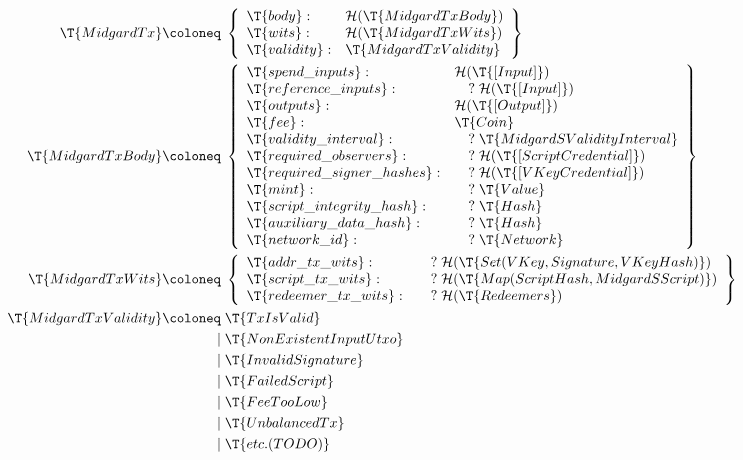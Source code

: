 \documentclass[../midgard.tex]{subfiles}
\begin{document}
\begingroup
\allowdisplaybreaks
\begin{align*}
    \T{MidgardTx} \coloneq\;& \left\{
    \begin{array}{ll}
        \T{body} : & \mathcal{H}(\T{MidgardTxBody}) \\
        \T{wits} : & \mathcal{H}(\T{MidgardTxWits}) \\
        \T{validity} : & \T{MidgardTxValidity} \\
    \end{array} \right\} \\
    \T{MidgardTxBody} \coloneq\;& \left\{
    \begin{array}{ll}
        \T{spend\_inputs} : & \mathcal{H}(\T{[Input]}) \\
        \T{reference\_inputs} : & \quad?\;\mathcal{H}(\T{[Input]}) \\
        \T{outputs} : & \mathcal{H}(\T{[Output]}) \\
        \T{fee} : & \T{Coin} \\
        \T{validity\_interval} : & \quad?\;\T{MidgardSValidityInterval} \\
        \T{required\_observers} : & \quad?\;\mathcal{H}(\T{[ScriptCredential]}) \\
        \T{required\_signer\_hashes} : & \quad?\;\mathcal{H}(\T{[VKeyCredential]}) \\
        \T{mint} : & \quad?\;\T{Value} \\
        \T{script\_integrity\_hash} : & \quad?\;\T{Hash} \\
        \T{auxiliary\_data\_hash} : & \quad?\;\T{Hash} \\
        \T{network\_id} : & \quad?\;\T{Network}
    \end{array} \right\}\\
    \T{MidgardTxWits} \coloneq\;& \left\{
    \begin{array}{ll}
        \T{addr\_tx\_wits} : & \quad?\;\mathcal{H}(\T{Set(VKey, Signature, VKeyHash)}) \\
        \T{script\_tx\_wits} : & \quad?\;\mathcal{H}(\T{Map(ScriptHash, MidgardSScript)}) \\
        \T{redeemer\_tx\_wits} : & \quad?\;\mathcal{H}(\T{Redeemers})
    \end{array} \right\}\\
    \T{MidgardTxValidity} \coloneq\;& \T{TxIsValid} \\
                              \mid\;& \T{NonExistentInputUtxo} \\
                              \mid\;& \T{InvalidSignature} \\
                              \mid\;& \T{FailedScript} \\
                              \mid\;& \T{FeeTooLow} \\
                              \mid\;& \T{UnbalancedTx} \\
                              \mid\;& \T{etc. (TODO)}
\end{align*}
\endgroup
\end{document}
